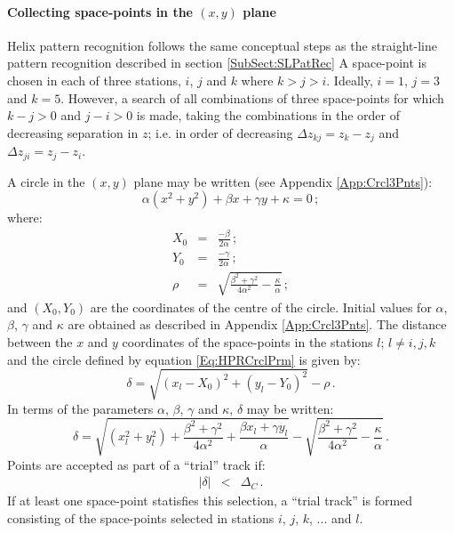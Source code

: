 \paragraph{Collecting space-points in the $(x, y)$ plane}

Helix pattern recognition follows the same conceptual steps as the
straight-line pattern recognition described in section
\ref{SubSect:SLPatRec}
A space-point is chosen in each of three stations, $i$, $j$ and $k$
where $k>j>i$.
Ideally, $i=1$, $j=3$ and $k=5$.
However, a search of all combinations of three space-points for which
$k-j>0$ and $j-i>0$ is made, taking the combinations in the order of
decreasing separation in $z$; 
i.e. in order of decreasing $\Delta z_{kj} = z_k - z_j$ and
$\Delta z_{ji} = z_j - z_i$. 

A circle in the $(x, y)$ plane may be written (see Appendix
\ref{App:Crcl3Pnts}):
\begin{equation}
  \alpha(x^2+y^2) + \beta x + \gamma y + \kappa = 0 \, ;
  \label{Eq:HPRCrclPrm}
\end{equation}
where:
\begin{eqnarray}
  X_0 & = & \frac{-\beta}{2 \alpha}                    \, ; \\
  Y_0 & = & \frac{-\gamma}{2 \alpha}                   \, ; \\
  \rho   & = & \sqrt{
                  \frac{\beta^2 + \gamma^2}{4 \alpha^2}
                  - \frac{\kappa}{\alpha}
                  } \, ;
\end{eqnarray}
and $(X_0, Y_0)$ are the coordinates of the centre of the circle.
Initial values for $\alpha$, $\beta$, $\gamma$ and $\kappa$ are
obtained as described in Appendix \ref{App:Crcl3Pnts}.
The distance between the $x$ and $y$ coordinates of the space-points
in the stations $l;\,l \ne i, j, k$ and the circle defined by equation
\ref{Eq:HPRCrclPrm} is given by:
\begin{equation}
  \delta = \sqrt{(x_l-X_0)^2 + (y_l-Y_0)^2} - \rho \,.
\end{equation}
In terms of the parameters $\alpha$, $\beta$, $\gamma$ and $\kappa$,
$\delta$ may be written:
\begin{equation}
  \delta = \sqrt{(x_l^2 + y_l^2)                       + 
                 \frac{\beta^2 + \gamma^2}{4 \alpha^2} +
                 \frac{\beta x_l + \gamma y_l}{\alpha}
           }                                            - 
           \sqrt{
                  \frac{\beta^2 + \gamma^2}{4 \alpha^2}
                  - \frac{\kappa}{\alpha}
                  }                                      \,.
\end{equation}
Points are accepted as part of a ``trial'' track if:
\begin{eqnarray}
  | \delta | & < & \Delta_C \, .
\end{eqnarray}
If at least one space-point statisfies this selection, a ``trial track''
is formed consisting of the space-points selected in stations 
$i$, $j$, $k$, ... and $l$.

